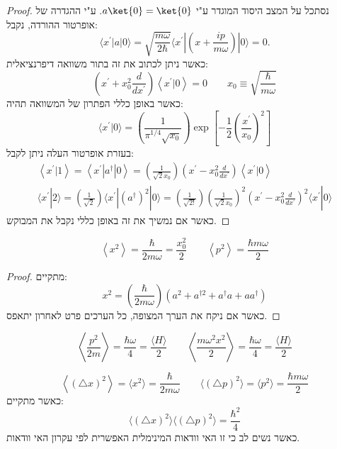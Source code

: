 \documentclass{tstextbook}
\begin{document}
\begin{proof}
נסתכל על המצב היסוד המוגדר ע"י \(a\ket{0}=\ket{0}\). ע"י ההגדרה של אופרטור ההורדה, נקבל:
$$\langle x^{\prime}|a|0\rangle=\sqrt{\frac{m\omega}{2\hbar}}\langle x^{\prime}|\left(x+\frac{i p}{m\omega}\right)|0\rangle=0.$$
כאשר ניתן לכתוב את זה בתור משוואה דיפרנציאלית:
$$\left(x^{\prime}+x_{0}^{2}\frac{d}{d x^{\prime}}\right)\left\langle  x^{\prime}|0 \right\rangle=0\qquad x_{0}\equiv{\sqrt{\frac{\hbar}{m\omega}}}$$
כאשר באופן כללי הפתרון של המשוואה תהיה:
$$\langle x^{\prime}|0\rangle=\left(\frac{1}{\pi^{1/4}\sqrt{x_{0}}}\right)\exp{\left[-\frac{1}{2}\left(\frac{x^{\prime}}{x_{0}}\right)^{2}\right]}$$
בעזרת אופרטור העלה ניתן לקבל:
$$\begin{gather}\left\langle  x^{\prime}|1 \right\rangle=\left\langle  x^{\prime}|a^{\dagger}|0 \right\rangle=\left(\frac{1}{\sqrt{2}x_{0}}\right)\left(x^{\prime}-x_{0}^{2}\frac{d}{d x^{\prime}}\right)\left\langle  x^{\prime}|0 \right\rangle  \\\langle x^{\prime}|2\rangle=\left(\frac{1}{\sqrt{2}}\right)\langle x^{\prime}|(a^{\dagger})^{2}|0\rangle=\left(\frac{1}{\sqrt{2!}}\right)\left(\frac{1}{\sqrt{2}x_{0}}\right)^{2}\left(x^{\prime}-x_{0}^{2}\frac{d}{d x^{\prime}}\right)^{2}\langle x^{\prime}|0\rangle
\end{gather}$$
כאשר אם נמשיך את זה באופן כללי נקבל את המבוקש.

\end{proof}
\begin{proposition}
$$\left\langle x^{2}\right\rangle=\frac\hbar{2m\omega}=\frac{x_{0}^{2}}2 \qquad \left\langle p^{2}\right\rangle=\frac{\hbar m\omega}{2}$$

\end{proposition}
\begin{proof}
מתקיים:
$$x^{2}=\left(\frac{\hbar}{2m\omega}\right)\left(a^{2}+a^{\dagger2}+a^{\dagger}a+a a^{\dagger}\right)$$
כאשר אם ניקח את הערך המצופה, כל הערכים פרט לאחרון יתאפס.

\end{proof}
\begin{proposition}
$$\left\langle\frac{p^{2}}{2m}\right\rangle=\frac{\hbar\omega}{4}=\frac{\langle H\rangle}{2}\qquad \left\langle\frac{m\omega^{2}x^{2}}{2}\right\rangle=\frac{\hbar\omega}{4}=\frac{\langle H\rangle}{2}$$

\end{proposition}
\begin{proposition}
$$\left\langle \left( \triangle x \right)^{2} \right\rangle=\langle x^{2}\rangle={\frac{\hbar}{2m\omega}}\qquad  \langle(\triangle p)^{2}\rangle=\langle p^{2}\rangle=\frac{\hbar m\omega}{2}$$
כאשר מתקיים:
$$\langle(\triangle x)^{2}\rangle\langle(\triangle p)^{2}\rangle={\frac{\hbar^{2}}{4}}$$
כאשר נשים לב כי זו האי וודאות המינימלית האפשרית לפי עקרון האי וודאות.

\end{proposition}
\end{document}
